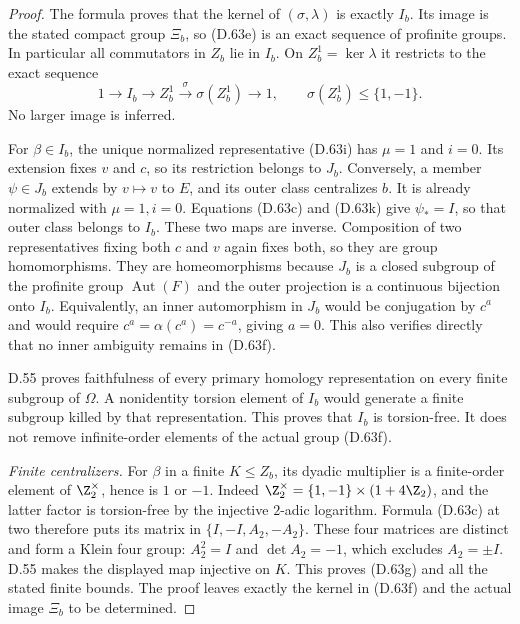 \begin{proof}
The formula proves that the kernel of
$(\sigma,\lambda)$ is exactly $I_b$.
Its image is the stated compact group $\Xi_b$,
so (D.63e) is an exact sequence of profinite groups.
In particular all commutators in $Z_b$ lie in $I_b$.
On $Z_b^1=\ker\lambda$ it restricts to the exact
sequence
\[
 1\longrightarrow I_b\longrightarrow Z_b^1
       \xrightarrow{\,\sigma\,}\sigma(Z_b^1)
       \longrightarrow1,\qquad
                 \sigma(Z_b^1)\leq\{1,-1\}.                 \tag{D.63m}
\]
No larger image is inferred.

For $\beta\in I_b$, the unique normalized
representative (D.63i) has $\mu=1$ and $i=0$.
Its extension fixes $v$ and $c$, so its restriction
belongs to $J_b$.
Conversely, a member $\psi\in J_b$ extends by
$v\mapsto v$ to $E$, and its outer class centralizes
$b$. It is already normalized with $\mu=1,i=0$.
Equations (D.63c) and (D.63k) give $\psi_*=I$,
so that outer class belongs to $I_b$.
These two maps are inverse.
Composition of two representatives fixing both
$c$ and $v$ again fixes both, so they are group
homomorphisms. They are homeomorphisms because
$J_b$ is a closed subgroup of the profinite group
$\operatorname{Aut}(F)$ and the outer projection is
a continuous bijection onto $I_b$.
Equivalently, an inner automorphism in $J_b$ would
be conjugation by $c^a$ and would require
$c^a=\alpha(c^a)=c^{-a}$, giving $a=0$.
This also verifies directly that no inner ambiguity
remains in (D.63f).

D.55 proves faithfulness of every primary homology
representation on every finite subgroup of $\Omega$.
A nonidentity torsion element of $I_b$ would generate
a finite subgroup killed by that representation.
This proves that $I_b$ is torsion-free.
It does not remove infinite-order elements of the
actual group (D.63f).

\emph{Finite centralizers.}
For $\beta$ in a finite $K\leq Z_b$, its dyadic
multiplier is a finite-order element of
$\Z_2^\times$, hence is $1$ or $-1$.
Indeed $\Z_2^\times=\{1,-1\}\times(1+4\Z_2)$,
and the latter factor is torsion-free by the
injective $2$-adic logarithm.
Formula (D.63c) at two therefore puts its matrix
in $\{I,-I,A_2,-A_2\}$.
These four matrices are distinct and form a
Klein four group: $A_2^2=I$ and
$\det A_2=-1$, which excludes $A_2=\pm I$.
D.55 makes the displayed map injective on $K$.
This proves (D.63g) and all the stated finite bounds.
The proof leaves exactly the kernel in (D.63f)
and the actual image $\Xi_b$ to be determined.
\end{proof}

